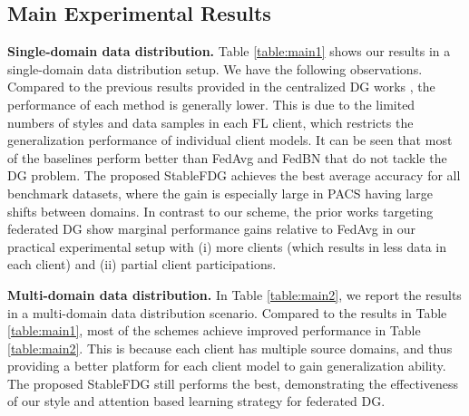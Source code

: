 \documentclass{article}
\theoremstyle{plain}
\theoremstyle{definition}
\theoremstyle{remark}
\begin{document}
\subsection{Main Experimental Results} \label{subsec:experiment_main}
 \vspace{-1mm}
\textbf{Single-domain data distribution.} Table  \ref{table:main1}  shows our  results in a single-domain data distribution setup. We have the following observations. Compared to the previous results provided in the centralized DG works \cite{zhou2021domain, li2022uncertainty}, the performance of each method is generally lower. This is due to the limited numbers of styles and data samples in each FL client,   which restricts the generalization performance of individual client models.  It can be seen that most of the baselines perform better than FedAvg and FedBN that do not tackle the DG problem.  
 The proposed StableFDG achieves the best average accuracy for all benchmark datasets, where the gain is especially large in PACS   having large  shifts between domains.  In contrast  to our scheme, the prior works \cite{chen2023federated, liu2021feddg, nguyen2022fedsr}  targeting federated DG show marginal performance gains relative to FedAvg in our practical experimental  setup  with (i) more clients (which results in less data in each client) and (ii) partial client participations. 

 
 
 
 
 
\textbf{Multi-domain data distribution.} In Table  \ref{table:main2}, we report the results in a multi-domain data distribution scenario. Compared to the results in Table  \ref{table:main1},  most of the schemes achieve improved performance in Table \ref{table:main2}. %
This is because each client has multiple source domains, and thus providing a better platform for each client model to gain generalization ability. The proposed StableFDG still performs the best, demonstrating the effectiveness of our style and attention based learning strategy for federated DG.
\end{document}
